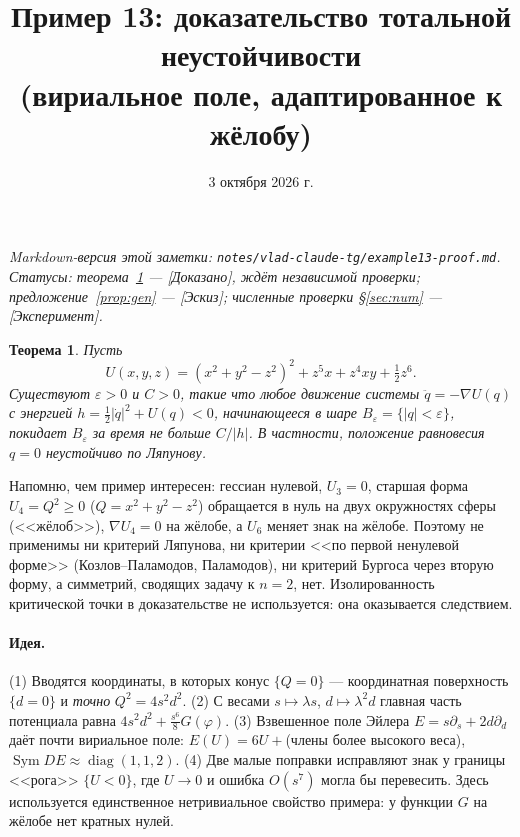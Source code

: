 \documentclass[11pt,a4paper]{article}
\title{Пример 13: доказательство тотальной неустойчивости\\[3pt]
\large (вириальное поле, адаптированное к жёлобу)}
\author{}
\date{3 октября 2026 г.}
\newtheorem{theorem}{Теорема}
\theoremstyle{definition}
\newcommand{\eps}{\varepsilon}
\DeclareMathOperator{\Sym}{Sym}
\DeclareMathOperator{\diag}{diag}
\begin{document}
\maketitle
\vspace{-6mm}

{\sloppy\noindent\emph{Markdown-версия этой заметки: \nolinkurl{notes/vlad-claude-tg/example13-proof.md}.
Статусы: теорема~\ref{thm:main} --- [Доказано], ждёт независимой проверки; предложение~\ref{prop:gen} ---
[Эскиз]; численные проверки \S\ref{sec:num} --- [Эксперимент].}\par}

\begin{theorem}\label{thm:main}
Пусть
\[
U(x,y,z)=(x^2+y^2-z^2)^2+z^5x+z^4xy+\tfrac12 z^6 .
\]
Существуют $\eps>0$ и $C>0$, такие что любое движение системы $\ddot q=-\nabla U(q)$ с энергией
$h=\frac12|\dot q|^2+U(q)<0$, начинающееся в шаре $B_\eps=\{|q|<\eps\}$, покидает $B_\eps$ за время
не больше $C/|h|$. В частности, положение равновесия $q=0$ неустойчиво по Ляпунову.
\end{theorem}

Напомню, чем пример интересен: гессиан нулевой, $U_3=0$, старшая форма $U_4=Q^2\ge0$
($Q=x^2+y^2-z^2$) обращается в нуль на двух окружностях сферы (<<жёлоб>>), $\nabla U_4=0$ на жёлобе,
а $U_6$ меняет знак на жёлобе. Поэтому не применимы ни критерий Ляпунова, ни критерии
<<по первой ненулевой форме>> (Козлов--Паламодов, Паламодов), ни критерий Бургоса через вторую форму,
а симметрий, сводящих задачу к $n=2$, нет. Изолированность критической точки в доказательстве
не используется: она оказывается следствием.

\paragraph{Идея.}
(1) Вводятся координаты, в которых конус $\{Q=0\}$ --- координатная поверхность $\{d=0\}$ и
\emph{точно} $Q^2=4s^2d^2$. (2) С весами $s\mapsto\lambda s$, $d\mapsto\lambda^2d$ главная часть
потенциала равна $4s^2d^2+\frac{s^6}{8}G(\varphi)$. (3) Взвешенное поле Эйлера
$E=s\partial_s+2d\partial_d$ даёт почти вириальное поле: $E(U)=6U+{}$(члены более высокого веса),
$\Sym DE\approx\diag(1,1,2)$. (4) Две малые поправки исправляют знак у границы <<рога>> $\{U<0\}$,
где $U\to0$ и ошибка $O(s^7)$ могла бы перевесить. Здесь используется единственное нетривиальное
свойство примера: у функции $G$ на жёлобе нет кратных нулей.
\end{document}
